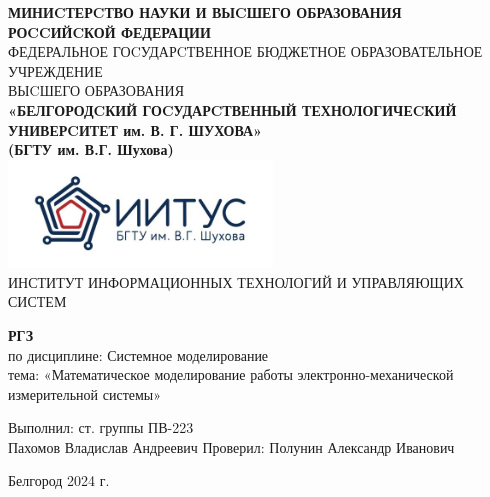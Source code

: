 \documentclass[a4paper,14pt]{extarticle}
\newcommand\textbox[1]{
	\parbox{.45\textwidth}{#1}
}
\begin{document}
\begin{center}
    \small{
        \textbf{МИНИCТЕРCТВО НАУКИ И ВЫCШЕГО ОБРАЗОВАНИЯ РОCCИЙCКОЙ ФЕДЕРАЦИИ}\\
        ФЕДЕРАЛЬНОЕ ГОCУДАРCТВЕННОЕ БЮДЖЕТНОЕ ОБРАЗОВАТЕЛЬНОЕ УЧРЕЖДЕНИЕ\\ВЫCШЕГО ОБРАЗОВАНИЯ \\
        \textbf{«БЕЛГОРОДCКИЙ ГОCУДАРCТВЕННЫЙ ТЕХНОЛОГИЧЕCКИЙ\\УНИВЕРCИТЕТ им. В. Г. ШУХОВА»\\ (БГТУ им. В.Г. Шухова)} \\
        \bigbreak
        \includegraphics[width=70mm]{log}\\
        ИНСТИТУТ ИНФОРМАЦИОННЫХ ТЕХНОЛОГИЙ И УПРАВЛЯЮЩИХ СИСТЕМ\\}
\end{center}

\vfill
\begin{center}
    \large{
        \textbf{
            РГЗ}}\\
    \normalsize{
        по дисциплине: Системное моделирование \\
        тема: «Математическое моделирование работы электронно-механической измерительной системы»}
\end{center}
\vfill
\hfill\textbox{
    Выполнил: ст. группы ПВ-223\\Пахомов Владислав Андреевич
    \bigbreak
    Проверил: Полунин Александр Иванович
}
\vfill\begin{center}
    Белгород 2024 г.
\end{center}
\newpage

\renewcommand{\contentsname}{Оглавление}
\tableofcontents\newpage
\end{document}
